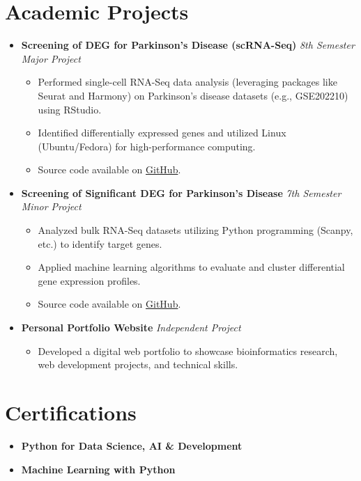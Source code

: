 \documentclass[13pt,a4paper]{article}
\newcommand{\resumeItem}[1]{\item\small{#1}}
\newcommand{\resumeProjectHeading}[2]{
  \vspace{4pt}\item
    \textbf{#1} \hfill \textit{#2} \vspace{-4pt}
}
\begin{document}
\section{Academic Projects}
\begin{itemize}[leftmargin=0.15in, label={}]
    \resumeProjectHeading
        {Screening of DEG for Parkinson's Disease (scRNA-Seq)}{8th Semester Major Project}
        \begin{itemize}
            \resumeItem{Performed single-cell RNA-Seq data analysis (leveraging packages like Seurat and Harmony) on Parkinson's disease datasets (e.g., GSE202210) using RStudio.}
            \resumeItem{Identified differentially expressed genes and utilized Linux (Ubuntu/Fedora) for high-performance computing.}
            \resumeItem{Source code available on \href{https://github.com/aman0001yadavdu-bit}{GitHub}.}
        \end{itemize}
    \resumeProjectHeading
        {Screening of Significant DEG for Parkinson's Disease}{7th Semester Minor Project}
        \begin{itemize}
            \resumeItem{Analyzed bulk RNA-Seq datasets utilizing Python programming (Scanpy, etc.) to identify target genes.}
            \resumeItem{Applied machine learning algorithms to evaluate and cluster differential gene expression profiles.}
            \resumeItem{Source code available on \href{https://github.com/aman0001yadavdu-bit}{GitHub}.}
        \end{itemize}
    \resumeProjectHeading
        {Personal Portfolio Website}{Independent Project}
        \begin{itemize}
            \resumeItem{Developed a digital web portfolio to showcase bioinformatics research, web development projects, and technical skills.}
        \end{itemize}
\end{itemize}

\section{Certifications}
\begin{itemize}[leftmargin=0.15in, label={}]
    \item \textbf{Python for Data Science, AI \& Development}
    \item \textbf{Machine Learning with Python}
\end{itemize}

\end{document}
